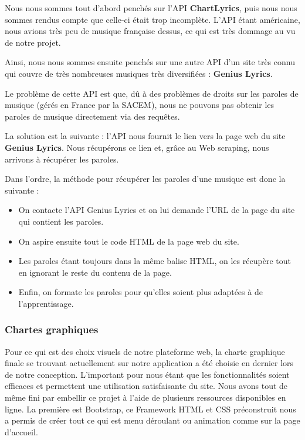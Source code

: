 \documentclass[12pt,french]{article}
\begin{document}
\medskip

Nous nous sommes tout d'abord penchés sur l'\gls{API} \textbf{ChartLyrics}, puis nous nous sommes rendus compte que celle-ci était trop incomplète. L'\gls{API} étant américaine, nous avions très peu de musique française dessus, ce qui est très dommage au vu de notre projet.

\medskip

Ainsi, nous nous sommes ensuite penchés sur une autre \gls{API} d'un site très connu qui couvre de très nombreuses musiques très diversifiées : \textbf{Genius Lyrics}.

Le problème de cette \gls{API} est que, dû à des problèmes de droits sur les paroles de musique (gérés en France par la \gls{SACEM}), nous ne pouvons pas obtenir les paroles de musique directement via des requêtes.

La solution est la suivante : l'\gls{API} nous fournit le lien vers la page web du site \textbf{Genius Lyrics}. Nous récupérons ce lien et, grâce au \gls{Web scraping}, nous arrivons à récupérer les paroles.

Dans l'ordre, la méthode pour récupérer les paroles d'une musique est donc la suivante :

\medskip

\begin{itemize}
	\item On contacte l'\gls{API} Genius Lyrics et on lui demande l'URL de la page du site qui contient les paroles.
	\item On aspire ensuite tout le code \gls{HTML} de la page web du site.
	\item Les paroles étant toujours dans la même balise \gls{HTML}, on les récupère tout en ignorant le reste du contenu de la page.
	\item Enfin, on formate les paroles pour qu'elles soient plus adaptées à de l'apprentissage.
\end{itemize}

\medskip

  \subsubsection{Chartes graphiques}

Pour ce qui est des choix visuels de notre plateforme web, la charte graphique finale se trouvant actuellement sur notre application a été choisie en dernier lors de notre conception. L'important pour nous étant que les fonctionnalités soient efficaces et permettent une utilisation satisfaisante du site. Nous avons tout de même fini par embellir ce projet à l'aide de plusieurs ressources disponibles en ligne. La première est Bootstrap, ce \gls{Framework} \gls{HTML} et \gls{CSS} préconstruit nous a permis de créer tout ce qui est menu déroulant ou animation comme sur la page d'accueil.
\newline
\end{document}
